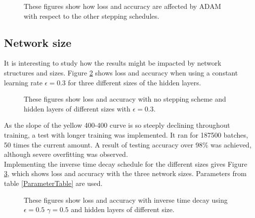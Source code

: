\documentclass{article}
\begin{document}
\begin{figure}[H]
  \centering
  \hfill
  \caption{These figures show how loss and accuracy are affected by ADAM with respect to the other stepping schedules.}
  \label{32stepADAMcompare}
\end{figure}

\subsection{Network size}\label{sec: size res}
It is interesting to study how the results might be impacted by network structures and sizes. Figure \ref{no3216400} shows loss and accuracy when using a constant learning rate $\epsilon = 0.3$ for three different sizes of the hidden layers. 
\begin{figure}[H]
  \centering
  \hfill
  \caption{These figures show loss and accuracy with no stepping scheme and hidden layers of different sizes with $\epsilon = 0.3$.}
  \label{no3216400}
\end{figure}
\noindent As the slope of the yellow 400-400 curve is so steeply declining throughout training, a test with longer training was implemented. It ran for 187500 batches, 50 times the current amount. A result of testing accuracy over 98\% was achieved, although severe overfitting was observed.\\

\noindent Implementing the inverse time decay schedule for the different sizes gives Figure \ref{itd3216400}, which shows loss and accuracy with the three network sizes. Parameters from table \ref{ParameterTable} are used.
\begin{figure}[H]
  \centering
  \hfill
  \caption{These figures show loss and accuracy with inverse time decay using $\epsilon = 0.5$ $\gamma = 0.5$ and hidden layers of different size.}
  \label{itd3216400}
\end{figure}
\end{document}
